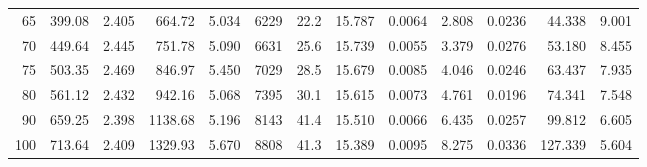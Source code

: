 \documentclass[10pt]{article}
\begin{document}
{\begin{tabular}{|r|rr|rr|rr|rr|rr|r|r|}
       65 &       399.08 &        2.405 &       664.72 &        5.034 &         6229 &         22.2 &       15.787 &       0.0064 &        2.808 &       0.0236 &       44.338 &        9.001 \\
       70 &       449.64 &        2.445 &       751.78 &        5.090 &         6631 &         25.6 &       15.739 &       0.0055 &        3.379 &       0.0276 &       53.180 &        8.455 \\
       75 &       503.35 &        2.469 &       846.97 &        5.450 &         7029 &         28.5 &       15.679 &       0.0085 &        4.046 &       0.0246 &       63.437 &        7.935 \\
       80 &       561.12 &        2.432 &       942.16 &        5.068 &         7395 &         30.1 &       15.615 &       0.0073 &        4.761 &       0.0196 &       74.341 &        7.548 \\
       90 &       659.25 &        2.398 &      1138.68 &        5.196 &         8143 &         41.4 &       15.510 &       0.0066 &        6.435 &       0.0257 &       99.812 &        6.605 \\
      100 &       713.64 &        2.409 &      1329.93 &        5.670 &         8808 &         41.3 &       15.389 &       0.0095 &        8.275 &       0.0336 &      127.339 &        5.604 \\
\hline
\end{tabular}
}







\pagebreak
\end{document}
